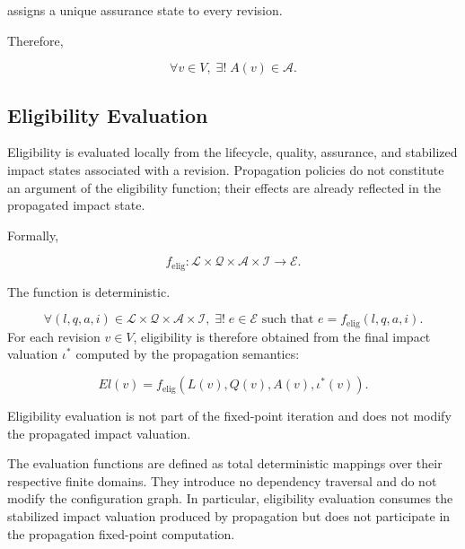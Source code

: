 \documentclass[10pt]{article}
\begin{document}
assigns a unique assurance state to every revision.

Therefore,

\begin{equation}
	\forall v\in V,\;
	\exists!\;
	A(v)\in\mathcal{A}.
	\label{eq:assurance_total}
\end{equation}

\subsection{Eligibility Evaluation}

Eligibility is evaluated locally from the lifecycle, quality, assurance, and
stabilized impact states associated with a revision. Propagation policies do
not constitute an argument of the eligibility function; their effects are
already reflected in the propagated impact state.

Formally,

\begin{equation}
	f_{\mathrm{elig}} :
	\mathcal{L}
	\times
	\mathcal{Q}
	\times
	\mathcal{A}
	\times
	\mathcal{I}
	\rightarrow
	\mathcal{E}.
	\label{eq:eligibility_function}
\end{equation}

The function is deterministic.

\begin{equation}
	\forall
	(l,q,a,i)
	\in
	\mathcal{L}
	\times
	\mathcal{Q}
	\times
	\mathcal{A}
	\times
	\mathcal{I},
	\;
	\exists!\;
	e
	\in
	\mathcal{E}
	\text{ such that }
	e
	=
	f_{\mathrm{elig}}(l,q,a,i).
	\label{eq:eligibility_deterministic}
\end{equation}
For each revision $v\in V$, eligibility is therefore obtained from the final
impact valuation $\iota^{*}$ computed by the propagation semantics:

\begin{equation}
	El(v)
	=
	f_{\mathrm{elig}}
	\left(
	L(v),
	Q(v),
	A(v),
	\iota^{*}(v)
	\right).
	\label{eq:eligibility_from_fixed_impact}
\end{equation}

Eligibility evaluation is not part of the fixed-point iteration and does not
modify the propagated impact valuation.

The evaluation functions are defined as total deterministic mappings over their
respective finite domains. They introduce no dependency traversal and do not
modify the configuration graph. In particular, eligibility evaluation consumes
the stabilized impact valuation produced by propagation but does not participate
in the propagation fixed-point computation.
\end{document}
